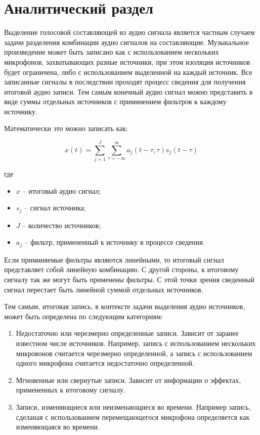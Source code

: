 \chapter{Аналитический раздел}
\label{cha:analysis}

Выделение голосовой составляющей из аудио сигнала является частным случаем задачи разделения комбинации аудио сигналов на составляющие. Музыкальное произведение может быть записано как с использованием нескольких микрофонов, захватывающих разные источники, при этом изоляция источников будет ограничена, либо с использованием выделенной на каждый источник. Все записанные сигналы в последствии проходят процесс сведения для получения итоговой аудио записи. Тем самым конечный аудио сигнал можно представить в виде суммы отдельных источников с приминением фильтров к каждому источнику.

Математически это можно записать как:

\begin{equation}
 x(t) = \sum_{j=1}^{J} \sum_{\tau=-\infty}^{\infty} a_{j}(t-\tau, \tau)s_j(t-\tau)
\end{equation}

где 

\begin{itemize}
	\item $x$ -- итоговый аудио сигнал;
	\item $s_j$ -- сигнал источника;
	\item $J$ -- количество источников;
	\item $a_j$ -- фильтр, примененный к источнику в процессе сведения.
\end{itemize}

Если приминяемые фильтры являются линейными, то итоговый сигнал представляет собой линейную комбинацию. С другой стороны, к итоговому сигналу так же могут быть применены фильтры. С этой точки зрения сведенный сигнал перестает быть линейной суммой отдельных источников. 

Тем самым, итоговая запись, в контексте задачи выделения аудио источников, может быть определена по следующим категориям:

\begin{enumerate}
	\item Недостаточно или черезмерно определенные записи. Зависит от заранее известном числе источников. Например, запись с использованием нескольких микровонов считается черезмерно определенной, а запись с использованием одного микрофона считается недостаточно определенной.
	\item Мгновенные или свернутые записи. Зависит от информации о эффектах, примененных к итоговому сигналу.
	\item Записи, изменяющиеся или неизменающиеся во времени. Например запись, сделаная с использованием перемещающегося микрофона определяется как изменяющаяся во времени.
\end{enumerate}

